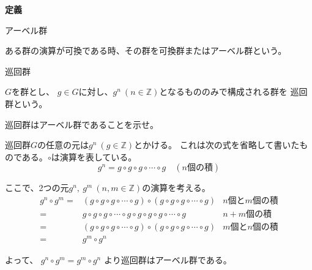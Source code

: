 \documentclass[12pt,b5paper]{ltjsarticle}
\begin{document}
\hrulefill

\textbf{定義}

アーベル群

ある群の演算が可換である時、その群を可換群またはアーベル群という。

巡回群

$G$を群とし、
$g\in G$に対し、$g^n \ (n\in\mathbb{Z})$となるもののみで構成される群を
巡回群という。

\hrulefill

巡回群はアーベル群であることを示せ。

\dotfill

巡回群$G$の任意の元は$g^n \ (g \in\mathbb{Z})$とかける。
これは次の式を省略して書いたものである。$\circ$は演算を表している。
\begin{equation}
 g^n = g\circ g\circ g\circ \cdots \circ g
\quad (n\text{個の積})
\end{equation}

ここで、2つの元$g^n,\ g^m\ (n,m\in \mathbb{Z})$の演算を考える。
\begin{align}
 g^n \circ g^m
=& (g\circ g\circ g\circ \cdots \circ g) \circ (g\circ g\circ g\circ \cdots \circ g)
& n\text{個と}m\text{個の積}\\
=& g\circ g\circ g\circ \cdots \circ g \circ g\circ g\circ g\circ \cdots \circ g
& n+m\text{個の積}\\
=& (g\circ g\circ g\circ \cdots \circ g) \circ (g\circ g\circ g\circ \cdots \circ g)
& m\text{個と}n\text{個の積}\\
=& g^m \circ g^n
\end{align}

よって、
$g^n \circ g^m = g^m \circ g^n$
より巡回群はアーベル群である。

\hrulefill
\end{document}
